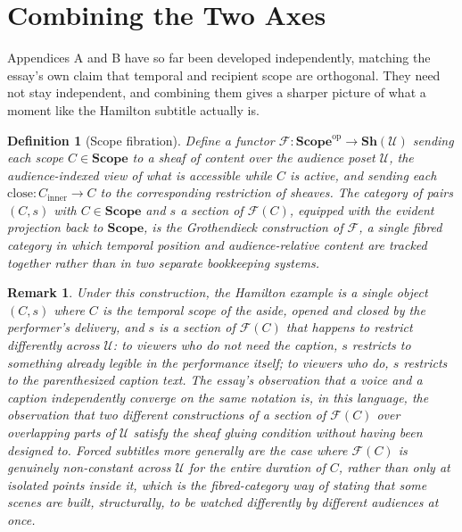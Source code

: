 \documentclass[11pt]{article}
\newtheorem{definition}{Definition}
\newtheorem{remark}{Remark}
\begin{document}
\section{Combining the Two Axes}

Appendices A and B have so far been developed independently, matching the essay's own claim that temporal and recipient scope are orthogonal. They need not stay independent, and combining them gives a sharper picture of what a moment like the Hamilton subtitle actually is.

\begin{definition}[Scope fibration]
Define a functor $\mathcal{F} : \mathbf{Scope}^{\mathrm{op}} \to \mathbf{Sh}(\mathcal{U})$ sending each scope $C \in \mathbf{Scope}$ to a sheaf of content over the audience poset $\mathcal{U}$, the audience-indexed view of what is accessible while $C$ is active, and sending each $\mathrm{close} : C_{\mathrm{inner}} \to C$ to the corresponding restriction of sheaves. The category of pairs $(C, s)$ with $C \in \mathbf{Scope}$ and $s$ a section of $\mathcal{F}(C)$, equipped with the evident projection back to $\mathbf{Scope}$, is the Grothendieck construction of $\mathcal{F}$, a single fibred category in which temporal position and audience-relative content are tracked together rather than in two separate bookkeeping systems.
\end{definition}

\begin{remark}
Under this construction, the Hamilton example is a single object $(C, s)$ where $C$ is the temporal scope of the aside, opened and closed by the performer's delivery, and $s$ is a section of $\mathcal{F}(C)$ that happens to restrict differently across $\mathcal{U}$: to viewers who do not need the caption, $s$ restricts to something already legible in the performance itself; to viewers who do, $s$ restricts to the parenthesized caption text. The essay's observation that a voice and a caption independently converge on the same notation is, in this language, the observation that two different constructions of a section of $\mathcal{F}(C)$ over overlapping parts of $\mathcal{U}$ satisfy the sheaf gluing condition without having been designed to. Forced subtitles more generally are the case where $\mathcal{F}(C)$ is genuinely non-constant across $\mathcal{U}$ for the entire duration of $C$, rather than only at isolated points inside it, which is the fibred-category way of stating that some scenes are built, structurally, to be watched differently by different audiences at once.
\end{remark}
\end{document}
